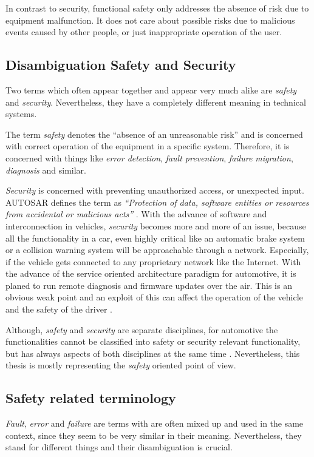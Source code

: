 In contrast to security, functional safety only addresses the absence of risk due to equipment malfunction. It does not care about possible risks due to malicious events caused by other people, or just inappropriate operation of the user.


\subsection{Disambiguation Safety and Security}
Two terms which often appear together and appear very much alike are \emph{safety} and \emph{security}. Nevertheless, they have a completely different meaning in technical systems.

The term \emph{safety} denotes the ``absence of an unreasonable risk'' \cite{autosar_glossary} \cite{iso26262:1} and is concerned with correct operation of the equipment in a specific system. Therefore, it is concerned with things like \emph{error detection}, \emph{fault prevention}, \emph{failure migration}, \emph{diagnosis} and similar.

\emph{Security} is concerned with preventing unauthorized access, or unexpected input. AUTOSAR defines the term as \emph{``Protection of data, software entities or resources from accidental or malicious acts''} \cite{autosar_glossary}. With the advance of software and interconnection in vehicles, \emph{security} becomes more and more of an issue, because all the functionality in a car, even highly critical like an automatic brake system or a collision warning system will be approachable through a network. Especially, if the vehicle gets connected to any proprietary network like the Internet. With the advance of the service oriented architecture paradigm for automotive, it is planed to run remote diagnosis and firmware updates over the air. This is an obvious weak point and an exploit of this can affect the operation of the vehicle and the safety of the driver \cite{nilsson2008}.

Although, \emph{safety} and \emph{security} are separate disciplines, for automotive the functionalities cannot be classified into safety or security relevant functionality, but has always aspects of both disciplines at the same time \cite{nilsson2008}. Nevertheless, this thesis is mostly representing the \emph{safety} oriented point of view.


\subsection{Safety related terminology}
\label{sec:fault,error,failure}
\emph{Fault}, \emph{error} and \emph{failure} are terms with are often mixed up and used in the same context, since they seem to be very similar in their meaning. Nevertheless, they stand for different things and their disambiguation is crucial.


